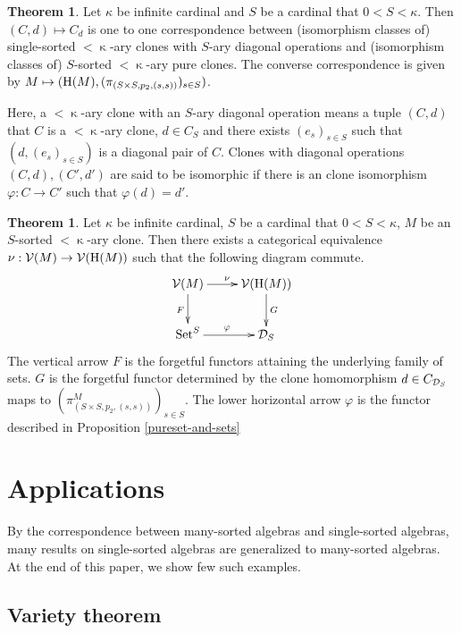 \documentclass[a4paper,10pt]{article}
\theoremstyle{definition}
\newtheorem{thm}[df]{Theorem}
\newcommand\ph{\varphi}
\newcommand\ra{\rightarrow}
\newcommand\Set{{\textbf{{\rm Set}}}}
\newcommand\mc{\mathclose}
\newcommand\V{\mathcal{V}}
\begin{document}
\begin{thm}
Let $\kappa$ be infinite cardinal and $S$ be a cardinal that $0<S<\kappa$.
Then $(C,d)\mapsto C_d$ is one to one correspondence between
(isomorphism classes of) single-sorted $<\mc\kappa$-ary clones with $S$-ary diagonal operations
and (isomorphism classes of) $S$-sorted $<\mc\kappa$-ary pure clones.
The converse correspondence is given by
$M\mapsto ({\rm H}(M),(\pi_{(S\times S,p_2,(s,s))})_{s\in S})$.
\end{thm}
Here, a $<\mc\kappa$-ary clone with an $S$-ary diagonal operation means
a tuple $(C,d)$ that $C$ is a $<\mc\kappa$-ary clone, $d\in C_S$ and
there exists $(e_s)_{s\in S}$ such that $(d,(e_s)_{s\in S})$ is
a diagonal pair of $C$.
Clones with diagonal operations $(C,d),(C',d')$ are said to be isomorphic
if there is an clone isomorphism $\ph:C\ra C'$ such that $\ph(d)=d'$.

\begin{thm}\label{main-theorem-categorical-equivalence}
Let $\kappa$ be infinite cardinal, $S$ be a cardinal that $0<S<\kappa$,
$M$ be an $S$-sorted $<\mc\kappa$-ary clone.
Then there exists a categorical equivalence $\nu:\V(M)\ra \V({\rm H}(M))$
such that the following diagram commute.
\[\xymatrix{
\V(M)\ar[r]^\nu \ar[d]_F& \V({\rm H}(M))\ar[d]^G\\
\Set^S \ar[r]^\ph & {\cal D}_S
}\]
The vertical arrow $F$ is the forgetful functors attaining the underlying family of sets. $G$ is the forgetful functor determined by the clone
homomorphism $d\in C_{{\cal D}_S}$ maps to $(\pi_{(S\times S,p_2,(s,s))}^M)_{s\in S}$.
The lower horizontal arrow $\ph$ is the functor described in 
Proposition \ref{pureset-and-sets}
\end{thm}

\section{Applications} \label{s-applications}

By the correspondence between many-sorted algebras and single-sorted algebras,
many results on single-sorted algebras are generalized to many-sorted algebras.
At the end of this paper, we show few such examples.

\subsection{Variety theorem} \label{s-variety-theorem}
\end{document}
